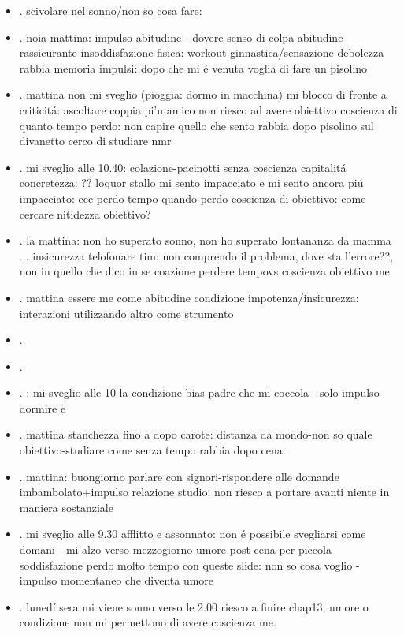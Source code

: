 \begin{itemize}
\item {}.
scivolare nel sonno/non so cosa fare: 
\item {}.
noia mattina: impulso abitudine - dovere senso di colpa abitudine rassicurante
insoddisfazione fisica: workout ginnastica/sensazione debolezza
rabbia memoria impulsi: dopo che mi \'e venuta voglia di fare un pisolino
\item {}.
mattina non mi sveglio (pioggia: dormo in macchina)
mi blocco di fronte a criticit\'a: ascoltare coppia pi'u amico
non riesco ad avere obiettivo
coscienza di quanto tempo perdo: non capire quello che sento
rabbia dopo pisolino sul divanetto
cerco di studiare nmr
\item {}.
mi sveglio alle 10.40: colazione-pacinotti senza coscienza capitalit\'a concretezza: ??
loquor stallo mi sento impacciato e mi sento ancora pi\'u impacciato: ecc
perdo tempo quando perdo coscienza di obiettivo: come cercare nitidezza obiettivo?
\item {}.
la mattina: non ho superato sonno, non ho superato lontananza da mamma ...
insicurezza telofonare tim: non comprendo il problema, dove sta l'errore??, non in quello che dico in se
coazione perdere tempovs coscienza obiettivo me
\item {}.
mattina essere me come abitudine
condizione impotenza/insicurezza: interazioni utilizzando altro come strumento
\item {}.

\item {}.
\item {}.
: mi sveglio alle 10 la condizione bias padre che mi coccola - solo impulso dormire e 
\item {}.
mattina stanchezza fino a dopo carote: distanza da mondo-non so quale obiettivo-studiare come senza tempo
rabbia dopo cena: 
\item {}.
mattina: buongiorno parlare con signori-rispondere alle domande imbambolato+impulso relazione
studio: non riesco a portare avanti niente in maniera sostanziale
\item {}.
mi sveglio alle 9.30 afflitto e assonnato: non \'e possibile svegliarsi come domani - mi alzo verso mezzogiorno 
umore post-cena per piccola soddisfazione
perdo molto tempo con queste slide: non so cosa voglio - impulso momentaneo che diventa umore
\item {}.
luned\'i sera mi viene sonno verso le 2.00 riesco a finire chap13, umore o condizione non mi permettono di avere coscienza me.


\end{itemize}
